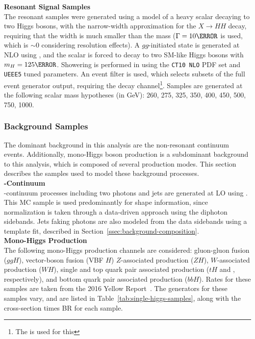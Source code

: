 \noindent\textbf{Resonant Signal Samples}\\
\indent The resonant samples were generated using a model of a heavy scalar decaying to two Higgs bosons, with the narrow-width approximation for the $X\rightarrow HH$ decay, requiring that the width is much smaller than the mass ($\Gamma = \unit{10}{\MeV}$ is used, which is $\sim$0 considering resolution effects). A $gg$-initiated state is generated at NLO using \AMCatNLO, and the scalar is forced to decay to two \gls{SM}-like Higgs bosons with $m_H = \unit{125}{\GeV}$. Showering is performed in \HERWIGpp using the \texttt{CT10 NLO} \gls{PDF} set and \texttt{UEEE5} tuned parameters. An event filter is used, which selects subsets of the full event generator output, requiring the \yybb decay channel\footnote{The  is used for this}. Samples are generated at the following scalar mass hypotheses (in GeV): 260, 275, 325, 350, 400, 450, 500, 750, 1000.


\subsubsection{Background Samples}\label{sssec:background-samples}
%
The dominant background in this analysis are the non-resonant \myy continuum events. Additionally, mono-Higgs boson production is a subdominant background to this analysis, which is composed of several production modes. This section describes the samples used to model these background processes.\\
%
\noindent\textbf{\yy-Continuum}\\
\indent \yy-continuum processes including two photons and jets are generated at \gls{LO} using \SHERPA. This \gls{MC} sample is used predominantly for shape information, since normalization is taken through a data-driven approach using the diphoton sidebands. Jets faking photons are also modeled from the data sidebands using a template fit, described in Section~\ref{ssec:background-composition}.\\

\noindent\textbf{Mono-Higgs Production}\\
\indent The following mono-Higgs production channels are considered: gluon-gluon fusion ($ggH$), vector-boson fusion (VBF $H$) $Z$-associated production ($ZH$), $W$-associated production ($WH$), single and top quark pair associated production ($tH$ and \tth, respectively), and bottom quark pair associated production ($bbH$). Rates for these samples are taken from the 2016 Yellow Report~\cite{yellow-report}. The generators for these samples vary, and are listed in Table~\ref{tab:single-higgs-samples}, along with the cross-section times \gls{BR} for each sample.

